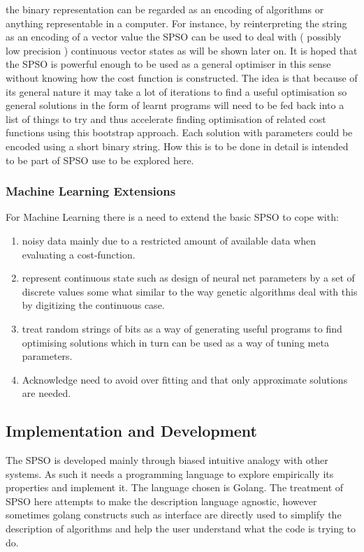 \documentclass[a4paper,oneside,english]{book}
\numberwithin{equation}{section}
\numberwithin{figure}{section}
\begin{document}
the binary representation can be regarded as an encoding of algorithms or anything representable in a computer. For instance, by reinterpreting the string as an encoding of a vector value the SPSO can be used to deal with  ( possibly low precision ) continuous vector states as will be shown later on. It is hoped that the SPSO is powerful enough to be used as a general optimiser in this sense without knowing how the cost function is constructed. The idea is that because of its general nature it may take a lot of iterations to find a useful optimisation so general solutions in the form of learnt programs will need to be fed back into a list of things to try and thus accelerate finding optimisation of related cost functions using this bootstrap approach. Each solution with parameters could be encoded using a short binary string. How this is to be done in detail is intended to be part of SPSO use to be explored here.

\subsubsection{Machine Learning Extensions }
For  Machine Learning there is a need to extend the basic SPSO to cope with:
\begin{enumerate}
	\item noisy data mainly due to a restricted amount of available data when evaluating a cost-function. 
	\item represent continuous state such as design of neural net parameters by a set of discrete values some what similar to the way genetic algorithms deal with this by digitizing the continuous case.
	\item treat random strings of bits as a way of generating useful programs  to find optimising solutions which in turn can be used as a way of tuning meta parameters.
	\item Acknowledge need to avoid over fitting and that only approximate solutions are needed. 
\end{enumerate}  
\subsection{Implementation and Development}
The SPSO is developed mainly through biased intuitive analogy with  other systems. As such it needs a programming language to explore empirically its properties and implement it. The language chosen is Golang. The treatment of SPSO here attempts to make the description language agnostic, however sometimes golang constructs such as interface are directly used to simplify the description of algorithms and help the user understand what the code is trying to do.  
\end{document}
